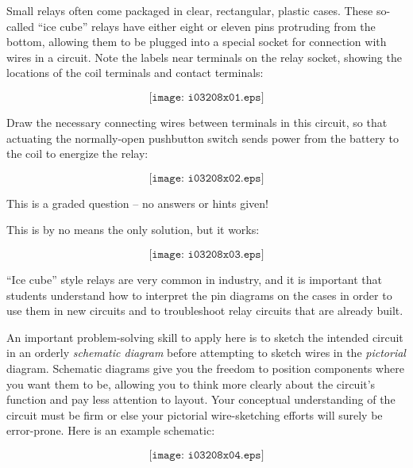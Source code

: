 

Small relays often come packaged in clear, rectangular, plastic cases.  These so-called ``ice cube'' relays have either eight or eleven pins protruding from the bottom, allowing them to be plugged into a special socket for connection with wires in a circuit.  Note the labels near terminals on the relay socket, showing the locations of the coil terminals and contact terminals:

$$\texttt{[image: i03208x01.eps]}$$

Draw the necessary connecting wires between terminals in this circuit, so that actuating the normally-open pushbutton switch sends power from the battery to the coil to energize the relay:

\vskip 20pt

$$\texttt{[image: i03208x02.eps]}$$

\vfil 

\eject






This is a graded question -- no answers or hints given!
 






This is by no means the only solution, but it works:

$$\texttt{[image: i03208x03.eps]}$$

``Ice cube'' style relays are very common in industry, and it is important that students understand how to interpret the pin diagrams on the cases in order to use them in new circuits and to troubleshoot relay circuits that are already built.

\vskip 10pt

An important problem-solving skill to apply here is to sketch the intended circuit in an orderly {\it schematic diagram} before attempting to sketch wires in the {\it pictorial} diagram.  Schematic diagrams give you the freedom to position components where you want them to be, allowing you to think more clearly about the circuit's function and pay less attention to layout.  Your conceptual understanding of the circuit must be firm or else your pictorial wire-sketching efforts will surely be error-prone.  Here is an example schematic:

$$\texttt{[image: i03208x04.eps]}$$




